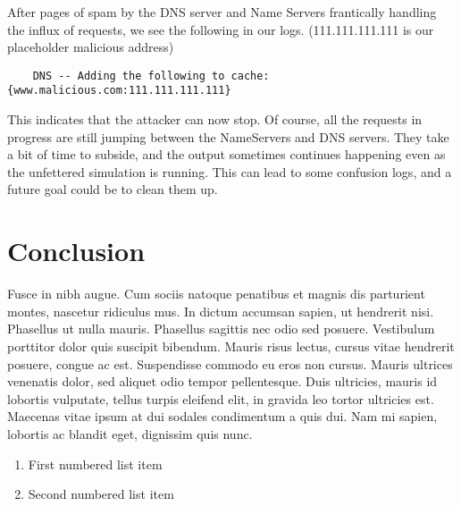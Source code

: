 \documentclass[a4paper, 12pt]{article} %
\begin{document}
After pages of spam by the DNS server and Name Servers frantically handling the influx of requests, we see the following in our logs. (111.111.111.111 is our placeholder malicious address)

\begin{verbatim}
    DNS -- Adding the following to cache: {www.malicious.com:111.111.111.111}
\end{verbatim}

This indicates that the attacker can now stop. Of course, all the requests in progress are still jumping between the NameServers and DNS servers. They take a bit of time to subside, and the output sometimes continues happening even as the unfettered simulation is running. This can lead to some confusion logs, and a future goal could be to clean them up.


\section*{Conclusion}

Fusce in nibh augue. Cum sociis natoque penatibus et magnis dis parturient montes, nascetur ridiculus mus. In dictum accumsan sapien, ut hendrerit nisi. Phasellus ut nulla mauris. Phasellus sagittis nec odio sed posuere. Vestibulum porttitor dolor quis suscipit bibendum. Mauris risus lectus, cursus vitae hendrerit posuere, congue ac est. Suspendisse commodo eu eros non cursus. Mauris ultrices venenatis dolor, sed aliquet odio tempor pellentesque. Duis ultricies, mauris id lobortis vulputate, tellus turpis eleifend elit, in gravida leo tortor ultricies est. Maecenas vitae ipsum at dui sodales condimentum a quis dui. Nam mi sapien, lobortis ac blandit eget, dignissim quis nunc.

\begin{enumerate}
\item First numbered list item
\item Second numbered list item
\end{enumerate}



%
%
%
%

\end{document}

